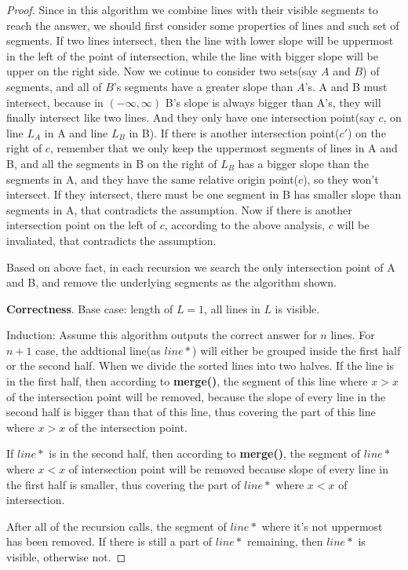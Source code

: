 \documentclass[paper=a4, fontsize=11pt]{scrartcl} %
\numberwithin{equation}{section} %
\numberwithin{figure}{section} %
\numberwithin{table}{section} %
\newenvironment{myproof}{\begin{proof}\setlength{\parindent}{2em}}{\end{proof}}
\begin{document}
\begin{enumerate}
\begin{myproof}
Since in this algorithm we combine lines with their visible segments to reach the answer, we should first consider some properties of lines and such set of segments. If two lines intersect, then the line with lower slope will be uppermost in the left of the point of intersection, while the line with bigger slope will be upper on the right side. Now we cotinue to consider two sets(say $A$ and $B$) of segments, and all of $B$'s segments have a greater slope than $A$'s.  A and B must intersect, because in $(-\infty, \infty)$ B's slope is always bigger than A's, they will finally intersect like two lines. And they only have one intersection point(say $c$, on line $L_A$ in A and line $L_B$ in B). If there is another intersection point($c'$) on the right of $c$, remember that we only keep the uppermost segments of lines in A and B, and all the segments in B on the right of $L_B$ has a bigger slope than the segments in A, and they have the same relative origin point($c$), so they won't intersect. If they intersect, there must be one segment in B has smaller slope than segments in A, that contradicts the assumption. Now if there is another intersection point on the left of $c$, according to the above analysis, $c$ will be invaliated, that contradicts the assumption.

Based on above fact, in each recursion we search the only intersection point of A and B, and remove the underlying segments as the algorithm shown.

\textbf{Correctness}.
 Base case: length of $L = 1$, all lines in $L$ is visible.

Induction: Assume this algorithm outputs the correct answer for $n$ lines. For $n+1$ case, the addtional line(as $line*$) will either be grouped inside the first half or the second half. When we divide the sorted lines into two halves. If the line is in the first half, then according to \textbf{merge()}, the segment of this line where $x > x$ of the intersection point will be removed, because the slope of every line in the second half is bigger than that of this line, thus covering the part of this line where $x > x$ of the intersection point.

If $line*$ is in the second half, then according to \textbf{merge()}, the segment of $line*$ where $x < x$ of intersection point will be removed because slope of every line in the first half is smaller, thus covering the part of $line*$ where $x < x$ of intersection.

After all of the recursion calls, the segment of $line*$ where it's not uppermost has been removed. If there is still a part of $line*$ remaining, then $line*$ is visible, otherwise not.
\end{myproof}


\end{enumerate}
\end{document}
